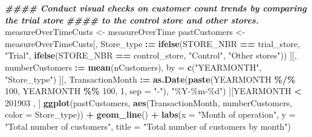 \documentclass[
]{article}
\newenvironment{Shaded}{\begin{snugshade}}{\end{snugshade}}
\newcommand{\AttributeTok}[1]{\textcolor[rgb]{0.13,0.29,0.53}{#1}}
\newcommand{\DecValTok}[1]{\textcolor[rgb]{0.00,0.00,0.81}{#1}}
\newcommand{\DocumentationTok}[1]{\textcolor[rgb]{0.56,0.35,0.01}{\textbf{\textit{#1}}}}
\newcommand{\FunctionTok}[1]{\textcolor[rgb]{0.13,0.29,0.53}{\textbf{#1}}}
\newcommand{\NormalTok}[1]{#1}
\newcommand{\OtherTok}[1]{\textcolor[rgb]{0.56,0.35,0.01}{#1}}
\newcommand{\SpecialCharTok}[1]{\textcolor[rgb]{0.81,0.36,0.00}{\textbf{#1}}}
\newcommand{\StringTok}[1]{\textcolor[rgb]{0.31,0.60,0.02}{#1}}
\begin{document}
\begin{Shaded}
\begin{Highlighting}[]
\DocumentationTok{\#\#\#\# Conduct visual checks on customer count trends by comparing the trial store }
\DocumentationTok{\#\#\#\# to the control store and other stores.}
\NormalTok{measureOverTimeCusts }\OtherTok{\textless{}{-}}\NormalTok{ measureOverTime}
\NormalTok{pastCustomers }\OtherTok{\textless{}{-}}\NormalTok{ measureOverTimeCusts[, Store\_type }\SpecialCharTok{:=} \FunctionTok{ifelse}\NormalTok{(STORE\_NBR }\SpecialCharTok{==}\NormalTok{ trial\_store, }\StringTok{"Trial"}\NormalTok{,}
                                      \FunctionTok{ifelse}\NormalTok{(STORE\_NBR }\SpecialCharTok{==}\NormalTok{ control\_store, }\StringTok{"Control"}\NormalTok{, }\StringTok{"Other stores"}\NormalTok{))}
\NormalTok{][, numberCustomers }\SpecialCharTok{:=} \FunctionTok{mean}\NormalTok{(nCustomers), by }\OtherTok{=} \FunctionTok{c}\NormalTok{(}\StringTok{"YEARMONTH"}\NormalTok{, }\StringTok{"Store\_type"}\NormalTok{)}
\NormalTok{][, TransactionMonth }\SpecialCharTok{:=} \FunctionTok{as.Date}\NormalTok{(}\FunctionTok{paste}\NormalTok{(YEARMONTH }\SpecialCharTok{\%/\%} \DecValTok{100}\NormalTok{, YEARMONTH }\SpecialCharTok{\%\%} \DecValTok{100}\NormalTok{, }\DecValTok{1}\NormalTok{, }\AttributeTok{sep =} \StringTok{"{-}"}\NormalTok{), }\StringTok{"\%Y{-}\%m{-}\%d"}\NormalTok{)}
\NormalTok{][YEARMONTH }\SpecialCharTok{\textless{}} \DecValTok{201903}\NormalTok{ , ]}
\FunctionTok{ggplot}\NormalTok{(pastCustomers, }\FunctionTok{aes}\NormalTok{(TransactionMonth, numberCustomers, }\AttributeTok{color =}\NormalTok{ Store\_type)) }\SpecialCharTok{+}
  \FunctionTok{geom\_line}\NormalTok{() }\SpecialCharTok{+}
  \FunctionTok{labs}\NormalTok{(}\AttributeTok{x =} \StringTok{"Month of operation"}\NormalTok{, }\AttributeTok{y =} \StringTok{"Total number of customers"}\NormalTok{, }\AttributeTok{title =} \StringTok{"Total number of customers by month"}\NormalTok{)}
\end{Highlighting}
\end{Shaded}
\end{document}
